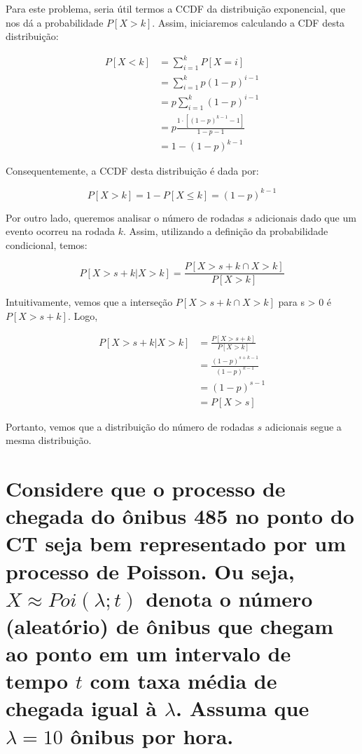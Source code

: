 \documentclass[a4paper]{article}
\begin{document}
Para este problema, seria útil termos a CCDF da distribuição exponencial, que nos dá a probabilidade $P[X > k]$. Assim, iniciaremos calculando a CDF desta distribuição: 

\begin{equation*}
    \begin{split}
        P[X < k] &= \sum_{i = 1}^k P[X = i] \\
            &= \sum_{i = 1}^k p(1-p)^{i-1}\\
            &= p\sum_{i = 1}^k (1-p)^{i-1}\\
            &= p\frac{1\cdot[(1-p)^{k-1}-1]}{1-p-1}\\
            &= 1-(1-p)^{k-1}
    \end{split}
\end{equation*}

Consequentemente, a CCDF desta distribuição é dada por: 

$$P[X > k] = 1 - P[X \leq k] = (1-p)^{k-1}$$

Por outro lado, queremos analisar o número de rodadas $s$ adicionais dado que um evento ocorreu na rodada $k$. Assim, utilizando a definição da probabilidade condicional, temos:

$$P[X > s + k | X > k] = \frac{P[X > s + k \cap X > k]}{P[X > k]}$$

Intuitivamente, vemos que a interseção $P[X > s + k \cap X > k]$ para s > 0 é $P[X > s + k]$. Logo, 

\begin{equation*}
    \begin{split}
        P[X > s + k | X > k] &= \frac{P[X > s + k]}{P[X > k]}\\
            &= \frac{(1-p)^{s+k-1}}{(1-p)^{k-1}}\\
            &= (1-p)^{s-1} \\
            &= P[X > s]
    \end{split}
\end{equation*}

Portanto, vemos que a distribuição do número de rodadas $s$ adicionais segue a mesma distribuição. 


\section{Considere que o processo de chegada do ônibus 485 no ponto do CT seja bem representado por um processo de Poisson. Ou seja, $X \approx Poi(\lambda; t)$ denota o número (aleatório) de ônibus que chegam ao ponto em um intervalo de tempo $t$ com taxa média de chegada igual à $\lambda$. Assuma que $\lambda = 10$ ônibus por hora.}
\end{document}

